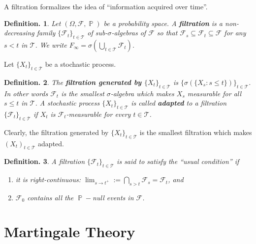 \documentclass[11pt, a4paper]{memoir}
\theoremstyle{change}
\theoremstyle{plain}
\theoremstyle{nonumberplain}
\newtheorem{definition}{Definition.}
\DeclareMathOperator{\pr}{{\mathbb{P}}}
\newcommand{\defn}[1]{{\boldmath\bfseries #1}}
\numberwithin{equation}{section}
\begin{document}
A filtration formalizes the idea of ``information acquired over time''.
\begin{definition}
    Let $(\Omega,\mathcal{F},\pr)$ be a probability space.
    A \defn{filtration} is a non-decreasing family $\{\mathcal{F}_t\}_{t\in \mathcal{T}}$ of sub-$\sigma$-algebras of $\mathcal{F}$ so that $\mathcal{F}_s\subseteq\mathcal{F}_t\subseteq\mathcal{F}$ for any $s<t$ in $\mathcal{T}$.
    We write $F_\infty=\sigma(\bigcup_{t\in \mathcal{T}}\mathcal{F}_t)$.
\end{definition}
Let $\{X_t\}_{t\in \mathcal{T}}$ be a stochastic process.
\begin{definition}
    The \defn{filtration generated by $\{X_t\}_{t\in \mathcal{T}}$} is $\{\sigma(\{X_s:s\leq t\})\}_{t\in \mathcal{T}}$.
    In other words $\mathcal{F}_t$ is the smallest $\sigma$-algebra which makes $X_s$ measurable for all $s\leq t$ in $\mathcal{T}$.
    A stochastic process $\{X_t\}_{t\in \mathcal{T}}$ is called \defn{adapted} to a filtration $\{\mathcal{F}_t\}_{t\in \mathcal{T}}$ if $X_t$ is $\mathcal{F}_t$-measurable for every $t\in \mathcal{T}$.
\end{definition}
Clearly, the filtration generated by $\{X_t\}_{t\in \mathcal{T}}$ is the smallest filtration which makes $(X_t)_{t\in \mathcal{T}}$ adapted.
\begin{definition}
    A filtration $\{\mathcal{F}_t\}_{t\in \mathcal{T}}$ is said to satisfy the ``usual condition'' if
    \begin{enumerate}[nl,r]
        \item it is right-continuous: $\lim_{s\to t^+}:=\bigcap_{s>t}\mathcal{F}_s=\mathcal{F}_t$, and
        \item $\mathcal{F}_0$ contains all the $\pr-$null events in $\mathcal{F}$.
    \end{enumerate}
\end{definition}
\section{Martingale Theory}
\end{document}
